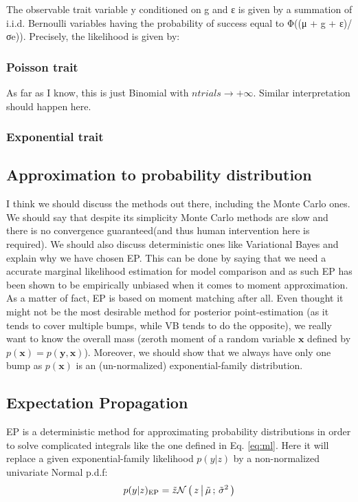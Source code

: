 The observable trait variable y conditioned on g and ε is given by a summation
of i.i.d. Bernoulli variables having the probability of success equal to
Φ((μ + g + ε)/σe)). Precisely, the likelihood is given by:

\subsubsection{Poisson trait}

As far as I know, this is just Binomial with $ntrials \rightarrow +\infty$.
Similar interpretation should happen here.

\subsubsection{Exponential trait}



\subsection{Approximation to probability distribution}

I think we should discuss the methods out there, including the Monte Carlo ones.
We should say that despite its simplicity Monte Carlo methods are slow and there
is no convergence guaranteed(and thus human intervention here is required). We
should also discuss deterministic ones like Variational Bayes and explain why we
have chosen EP. This can be done by saying that we need a accurate marginal
likelihood estimation for model comparison and as such EP has been shown to be
empirically unbiased when it comes to moment approximation. As a matter of fact,
EP is based on moment matching after all. Even thought it might not be the most
desirable method for posterior point-estimation (as it tends to cover multiple
bumps, while VB tends to do the opposite), we really want to know the overall
mass (zeroth moment of a random variable $\mathbf x$ defined by $p(\mathbf x) =
p(\mathbf y, \mathbf x)$). Moreover, we should show that we always have only one
bump as $p(\mathbf x)$ is an (un-normalized) exponential-family distribution.

\subsection{Expectation Propagation}

EP is a deterministic method for approximating probability distributions in
order to solve complicated integrals like the one defined in Eq. \eqref{eq:ml}.
Here it will replace a given exponential-family likelihood $p(y|z)$ by a
non-normalized univariate Normal p.d.f:
\begin{align*}
  p(y|z)_{\text{EP}} = \tilde z \mathcal{N}\left(\, { {z} \, \big| \, {\tilde \mu} } \,;\, { {\tilde \sigma^2} } \,\right)
\end{align*}

